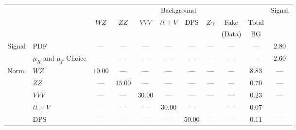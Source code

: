 \small\renewcommand{\tabcolsep}{4pt}
\begin{tabular}{|cl||ccccccc|c||c|}
\hline
 & & \multicolumn{8}{c||}{Background} & Signal \\ 
 & & $WZ$ & $ZZ$ & $VVV$ & $t\overline{t}+V$ & DPS & $Z\gamma$ & Fake & Total & \\ 
 & & &  &  &  &  &  & (Data) & BG & \\ 
\hline\hline
\multirow{2}{*}{Signal}
& PDF &  --- &  --- &  --- &  --- &  --- &  --- &  --- &  --- & $2.80$\\ 
\cline{2-11}
& $\mu_{R}$ and $\mu_{F}$ Choice &  --- &  --- &  --- &  --- &  --- &  --- &  --- &  --- & $2.60$\\ 
\hline
\multirow{5}{*}{Norm.}
& $WZ$ & $10.00$&  --- &  --- &  --- &  --- &  --- &  --- & $8.83$&  ---\\ 
\cline{2-11}
& $ZZ$ &  --- & $15.00$&  --- &  --- &  --- &  --- &  --- & $0.70$&  ---\\ 
\cline{2-11}
& $VVV$ &  --- &  --- & $30.00$&  --- &  --- &  --- &  --- & $0.23$&  ---\\ 
\cline{2-11}
& $t\overline{t}+V$ &  --- &  --- &  --- & $30.00$&  --- &  --- &  --- & $0.07$&  ---\\ 
\cline{2-11}
& DPS &  --- &  --- &  --- &  --- & $50.00$&  --- &  --- & $0.11$&  ---\\ 
\hline
\end{tabular}
